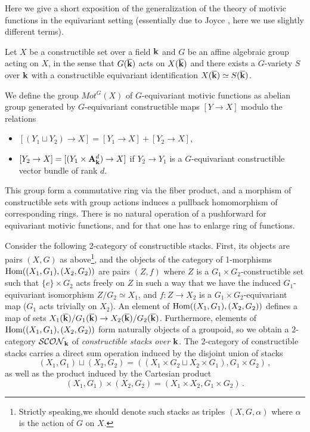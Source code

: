 \documentclass[12pt]{article}
\begin{document}
Here we give a short exposition of the generalization of the theory of motivic functions
in the equivariant setting (essentially due to  Joyce  \cite{Jo4},  here we use slightly different terms).

Let $X$ be a constructible set over a field ${\bf k}$ and $G$ be an affine algebraic group acting on $X$, in the sense that $G({\overline{\bf k}})$ acts on $X({\overline{\bf k}})$ and there
exists a $G$-variety $S$ over ${\bf k}$ with a constructible equivariant identification $X({\overline{\bf k}})\simeq S({\overline{\bf k}})$. 

We define the group $Mot^G(X)$ of $G$-equivariant motivic functions as abelian group generated by $G$-equivariant constructible maps $[Y\to X]$
 modulo the relations \begin{itemize}
\item $[(Y_1\sqcup Y_2)\to X]=[Y_1\to X]+[Y_2\to X]$,
\item $[Y_2\to X]=[(Y_1\times {\bf A}_{\bf k}^d)\to X]$ if $Y_2\to Y_1$ is a $G$-equivariant constructible vector 
bundle of rank $d$.
\end{itemize}
This group form a commutative ring via the fiber product, and a morphism of constructible sets with group actions induces a pullback homomorphism
 of corresponding rings. There is no natural operation of a pushforward for equivariant motivic functions, and for that one has to enlarge
   ring of functions.


  Consider the following 2-category of constructible stacks. First, its objects are pairs
$(X,G)$ as above\footnote{Strictly speaking,we should denote such stacks as triples $(X,G,\alpha)$ where $\alpha$ is the action of $G$ on $X$.}, and the objects of the category of 1-morphisms $\operatorname{Hom}((X_1,G_1),(X_2,G_2))$ are pairs $(Z,f)$ where
$Z$ is a $G_1\times G_2$-constructible set such that $\{e\}\times G_2$ acts freely on $Z$ in such a way that we have the induced $G_1$-equivariant isomorphism
$Z/G_2\simeq X_1$, and $f:Z\to X_2$ is a $G_1\times G_2$-equivariant map ($G_1$ acts trivially on $X_2$). An element of
$\operatorname{Hom}((X_1,G_1),(X_2,G_2))$ defines a map of sets $X_1({\overline{\bf k}})/G_1({\overline{\bf k}})\to X_2({\overline{\bf k}})/G_2({\overline{\bf k}})$.
Furthermore,  elements of $\operatorname{Hom}((X_1,G_1),(X_2,G_2))$ form naturally objects of a groupoid, so we obtain a $2$-category ${\cal SCON}_{{\bf k}}$ of {\it constructible stacks over ${\bf k}$}.   The 2-category of constructible stacks carries a direct sum operation induced by the disjoint union of stacks $$(X_1,G_1)\sqcup (X_2,G_2)=
((X_1\times G_2\sqcup X_2\times G_1),G_1\times G_2)\,,$$ as well as the product induced by the Cartesian product
$$(X_1,G_1)\times (X_2,G_2)=(X_1\times X_2,G_1\times G_2)\,.$$
\end{document}
